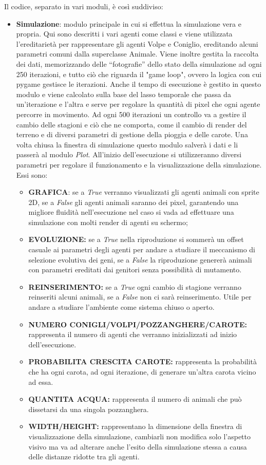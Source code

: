\documentclass[11pt]{article}
\begin{document}
Il codice, separato in vari moduli, è così suddiviso: \begin{itemize}
    \item \textbf{Simulazione}: modulo principale in cui si effettua la simulazione vera e propria. Qui sono descritti i vari agenti come classi e viene utilizzata l'ereditarietà per rappresentare gli agenti Volpe e Coniglio, ereditando alcuni parametri comuni dalla superclasse Animale. Viene inoltre gestita la raccolta dei dati, memorizzando delle “fotografie” dello stato della simulazione ad ogni 250 iterazioni, e tutto ciò che riguarda il "game loop", ovvero la logica con cui pygame gestisce le iterazioni. Anche il tempo di esecuzione è gestito in questo modulo e viene calcolato sulla base del lasso temporale che passa da un'iterazione e l'altra e serve per regolare la quantità di pixel che ogni agente percorre in movimento. Ad ogni 500 iterazioni un controllo va a gestire il cambio delle stagioni e ciò che ne comporta, come il cambio di render del terreno e di diversi parametri di gestione della pioggia e delle carote. Una volta chiusa la finestra di simulazione questo modulo salverà i dati e li passerà al modulo \textit{Plot}. All'inizio dell'esecuzione si utilizzeranno diversi parametri per regolare il funzionamento e la visualizzazione della simulazione. Essi sono:
    \begin{itemize}
        \item \textbf{GRAFICA}: se a \textit{True} verranno visualizzati gli agenti animali con sprite 2D, se a \textit{False} gli agenti animali saranno dei pixel, garantendo una migliore fluidità nell'esecuzione nel caso si vada ad effettuare una simulazione con molti render di agenti su schermo;
        \item \textbf{EVOLUZIONE:} se a \textit{True} nella riproduzione si sommerà un offset casuale ai parametri degli agenti per andare a studiare il meccanismo di selezione evolutiva dei geni, se a \textit{False} la riproduzione genererà animali con parametri ereditati dai genitori senza possibilità di mutamento.
        \item \textbf{REINSERIMENTO:} se a \textit{True} ogni cambio di stagione verranno reinseriti alcuni animali, se a \textit{False} non ci sarà reinserimento. Utile per andare a studiare l'ambiente come sistema chiuso o aperto.
        \item \textbf{NUMERO CONIGLI/VOLPI/POZZANGHERE/CAROTE:}  rappresenta il numero di agenti che verranno inizializzati ad inizio dell’esecuzione.
        \item \textbf{PROBABILITA CRESCITA CAROTE:}  rappresenta la probabilità che ha ogni carota, ad ogni iterazione, di generare un’altra carota vicino ad essa. 
        \item \textbf{QUANTITA ACQUA:}  rappresenta il numero di animali che può dissetarsi da una singola pozzanghera.
        \item \textbf{WIDTH/HEIGHT:}  rappresentano la dimensione della finestra di visualizzazione della simulazione, cambiarli non modifica solo l’aspetto visivo ma va ad alterare anche l’esito della simulazione stessa a causa delle distanze ridotte tra gli agenti.


\end{itemize}
\end{itemize}
\end{document}
